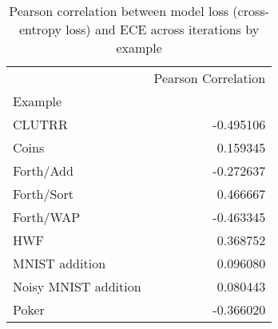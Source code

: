 \begin{table}
\centering
\caption{Pearson correlation between model loss (cross-entropy loss) and ECE across iterations by example}
\label{tbl:loss_ECE_evolution_corr_by_example}
\begin{tabular}{lr}
\toprule
{} &  Pearson Correlation \\
Example              &                      \\
\midrule
CLUTRR               &            -0.495106 \\
Coins                &             0.159345 \\
Forth/Add            &            -0.272637 \\
Forth/Sort           &             0.466667 \\
Forth/WAP            &            -0.463345 \\
HWF                  &             0.368752 \\
MNIST addition       &             0.096080 \\
Noisy MNIST addition &             0.080443 \\
Poker                &            -0.366020 \\
\bottomrule
\end{tabular}
\end{table}
